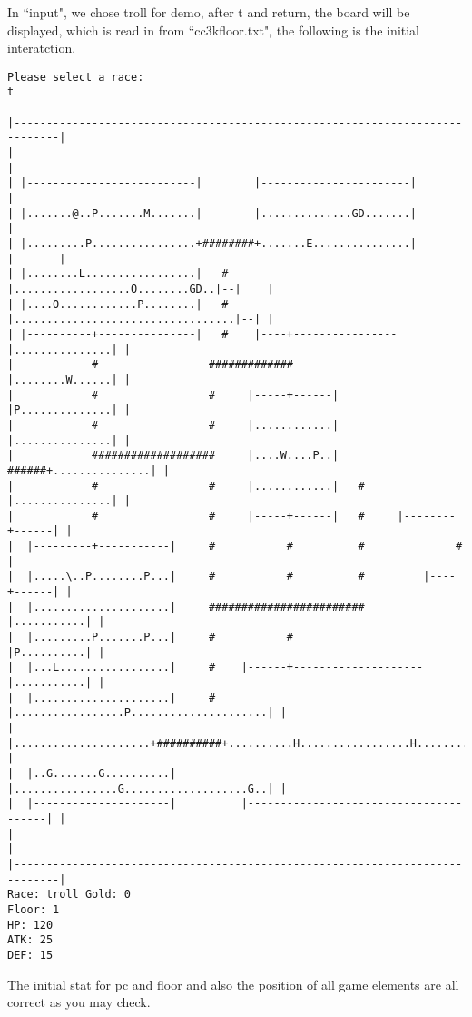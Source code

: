 \documentclass[11pt]{article}
\theoremstyle{plain}
\begin{document}
In ``input", we chose troll for demo, after t and return, the board will be 
displayed, which is read in from ``cc3kfloor.txt", the following is the initial
interatction.
\begin{Verbatim}[fontsize=\small]
Please select a race:
t

|-----------------------------------------------------------------------------|
|                                                                             |
| |--------------------------|        |-----------------------|               |
| |.......@..P.......M.......|        |..............GD.......|               |
| |.........P................+########+.......E...............|-------|       |
| |........L.................|   #    |..................O........GD..|--|    |
| |....O............P........|   #    |..................................|--| |
| |----------+---------------|   #    |----+----------------|...............| |
|            #                 #############                |........W......| |
|            #                 #     |-----+------|         |P..............| |
|            #                 #     |............|         |...............| |
|            ###################     |....W....P..|   ######+...............| |
|            #                 #     |............|   #     |...............| |
|            #                 #     |-----+------|   #     |--------+------| |
|  |---------+-----------|     #           #          #              #        |
|  |.....\..P........P...|     #           #          #         |----+------| |
|  |.....................|     ########################         |...........| |
|  |.........P.......P...|     #           #                    |P..........| |
|  |...L.................|     #    |------+--------------------|...........| |
|  |.....................|     #    |.................P.....................| |
|  |.....................+##########+..........H.................H..........| |
|  |..G.......G..........|          |................G...................G..| |
|  |---------------------|          |---------------------------------------| |
|                                                                             |
|-----------------------------------------------------------------------------|
Race: troll Gold: 0                                                    Floor: 1
HP: 120
ATK: 25
DEF: 15
\end{Verbatim}
The initial stat for pc and floor and also the position of all game elements
are all correct as you may check.
\end{document}
